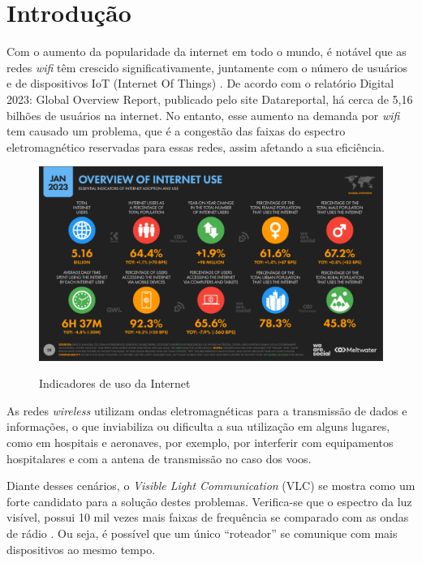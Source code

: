 \chapter{Introdução}

Com o aumento da popularidade da internet em todo o mundo, é notável que as redes \textit{wifi} têm crescido significativamente, juntamente com o número de usuários e de dispositivos IoT (Internet Of Things) \cite{matheus2017comunicaccao}. De acordo com o relatório Digital 2023: Global Overview Report, publicado pelo site Datareportal, há cerca de 5,16 bilhões de usuários na internet. No entanto, esse aumento na demanda por \textit{wifi} tem causado um problema, que é a congestão das faixas do espectro eletromagnético reservadas para essas redes, assim afetando a sua eficiência.

\begin{figure}[!htbp]
  \caption{Indicadores de uso da Internet}
  \includegraphics[scale=0.4]{images/internet_use.png}
  \label{figura:usoInternet}
\end{figure}

As redes \textit{wireless} utilizam ondas eletromagnéticas para a transmissão de dados e informações, o que inviabiliza ou dificulta a sua utilização em alguns lugares, como em hospitais e aeronaves, por exemplo, por interferir com equipamentos hospitalares e com a antena de transmissão no caso dos voos.

Diante desses cenários, o \textit{Visible Light Communication} (VLC) se mostra como um forte candidato para a solução destes problemas.
Verifica-se que o espectro da luz visível, possui 10 mil vezes mais faixas de frequência se comparado com as ondas de rádio \cite[p. 14]{conceiccao2015comunicaccao}.
Ou seja, é possível que um único ``roteador” se comunique com mais dispositivos ao mesmo tempo.

